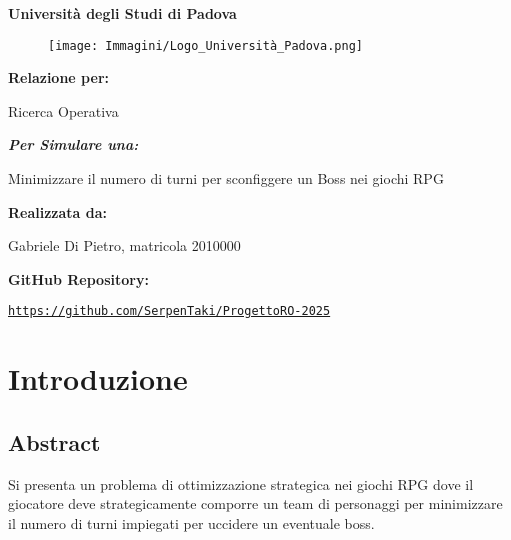 \documentclass[12pt]{article}
\renewcommand{\familydefault}{\rmdefault} %
\begin{document}
\begin{titlepage}
    \centering
    {\Huge \textbf{Università degli Studi di Padova} \par}
    \vspace{1cm}
    \begin{figure}[h!]
        \centering
        \texttt{[image: Immagini/Logo\_Università\_Padova.png]}
    \end{figure}
    \vspace{0.5cm}
    {\LARGE \textbf{Relazione per:} \par}
    {\Huge Ricerca Operativa \par}
    \vspace{0.5cm}
    {\Large \textit{\textbf{Per Simulare una:}} \par}
    {\Large Minimizzare il numero di turni per sconfiggere un Boss nei giochi RPG \par}
    \vfill
    \textbf{Realizzata da:} \par
    Gabriele Di Pietro, matricola 2010000 \par
    \vspace{0.5cm}
    \textbf{GitHub Repository:} \par
    \texttt{\url{https://github.com/SerpenTaki/ProgettoRO-2025}}
\end{titlepage}
    \renewcommand{\familydefault}{\sfdefault} %
    \fontsize{10}{12}\selectfont
    \newpage
    \section{Introduzione}
    \subsection{Abstract}
    Si presenta un problema di ottimizzazione strategica nei giochi RPG dove il giocatore deve strategicamente comporre un team di personaggi per minimizzare il numero di turni impiegati per uccidere un eventuale boss.\\
\end{document}

